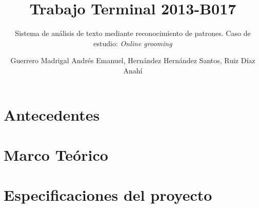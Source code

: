 \documentclass[oneside,10pt]{book}
\title{Trabajo Terminal 2013-B017}
\subtitle{Sistema de an\'alisis de texto mediante reconocimiento de patrones. Caso de estudio: \textit{Online grooming}}
\author{Guerrero Madrigal Andr\'es Emanuel, Hern\'andez Hern\'andez Santos, Ruiz D\'iaz Anah\'i}
\begin{document}


\thispagestyle{empty}

\frontmatter
\tableofcontents
\frontmatter
\listoffigures %
\frontmatter
\listoftables %

\mainmatter

\chapter{Antecedentes}





\chapter{Marco Te\'orico}




%
%
%
%




%



\chapter{Especificaciones del proyecto}





%	
%
%
%
%
%
%
%
%

\end{document}
